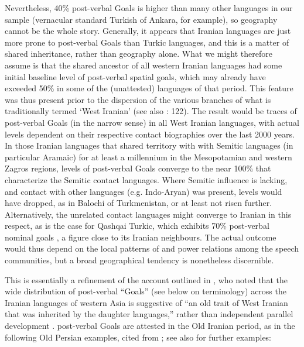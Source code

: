 \documentclass[output=paper,colorlinks,citecolor=brown,draftmode]{langscibook}
\begin{document}
Nevertheless, 40\% post-verbal Goals is higher than many other  languages in our sample (vernacular standard Turkish of Ankara,  for example), so geography cannot be the whole story. Generally, it appears that Iranian languages are just more prone to post-verbal Goals than Turkic languages, and this is a matter of shared inheritance, rather than geography alone. What we might therefore assume is that the shared ancestor of all western Iranian languages had some initial baseline level of post-verbal spatial goals, which may already have exceeded 50\% in some of the (unattested) languages of that period. This feature was thus present prior to the dispersion of the various branches of what is traditionally termed `West Iranian' (see also \citealt{Korn2022Targets}: 122). The result would be traces of post-verbal Goals (in the narrow sense) in all West Iranian languages, with actual levels dependent on their respective contact biographies over the last 2000 years. In those Iranian languages that shared territory with with Semitic languages (in particular Aramaic) for at least a millennium in the Mesopotamian and western Zagros regions, levels of post-verbal Goals converge to the near 100\% that characterize the Semitic contact languages. Where Semitic influence is lacking, and contact with other  languages (e.g. Indo-Aryan) was present, levels would have dropped, as in Balochi of Turkmenistan, or at least not risen further. Alternatively, the unrelated  contact languages might converge to Iranian in this respect, as is the case for Qashqai Turkic, which exhibits 70\% post-verbal nominal goals \citep{schreiber_oghuz_2021}, a figure close to its Iranian neighbours. The actual outcome would thus depend on the local patterns of  and power relations among the speech communities, but a broad geographical tendency is nonetheless discernible.

This is essentially a refinement of the account outlined in \citet{haig_verb-goal_2015}, who noted that the wide distribution of post-verbal ``Goals'' (see below on terminology) across the Iranian languages of western Asia is suggestive of ``an old trait of West Iranian that was inherited by the daughter languages,'' rather than independent parallel development \citep[421]{haig_verb-goal_2015}. post-verbal Goals are attested in the Old Iranian period, as in the following Old Persian examples, cited from \citet[421]{haig_verb-goal_2015}; see also \citet{Jahani2018Post-verbal} for further examples: 
\end{document}
